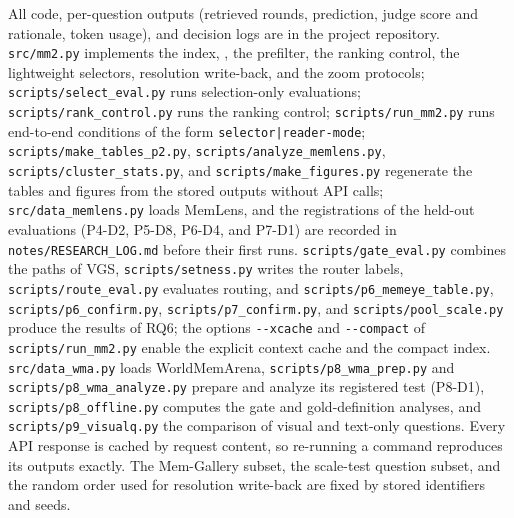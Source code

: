 All code, per-question outputs (retrieved rounds, prediction, judge score and rationale, token usage), and decision logs are in the project repository. \nolinkurl{src/mm2.py} implements the index, \qss{}, the prefilter, the ranking control, the lightweight selectors, resolution write-back, and the zoom protocols; \nolinkurl{scripts/select_eval.py} runs selection-only evaluations; \nolinkurl{scripts/rank_control.py} runs the ranking control; \nolinkurl{scripts/run_mm2.py} runs end-to-end conditions of the form \nolinkurl{selector|reader-mode}; \nolinkurl{scripts/make_tables_p2.py}, \nolinkurl{scripts/analyze_memlens.py}, \nolinkurl{scripts/cluster_stats.py}, and \nolinkurl{scripts/make_figures.py} regenerate the tables and figures from the stored outputs without API calls; \nolinkurl{src/data_memlens.py} loads MemLens, and the registrations of the held-out evaluations (P4-D2, P5-D8, P6-D4, and P7-D1) are recorded in \nolinkurl{notes/RESEARCH_LOG.md} before their first runs. \nolinkurl{scripts/gate_eval.py} combines the paths of VGS, \nolinkurl{scripts/setness.py} writes the router labels, \nolinkurl{scripts/route_eval.py} evaluates routing, and \nolinkurl{scripts/p6_memeye_table.py}, \nolinkurl{scripts/p6_confirm.py}, \nolinkurl{scripts/p7_confirm.py}, and \nolinkurl{scripts/pool_scale.py} produce the results of RQ6; the options \nolinkurl{--xcache} and \nolinkurl{--compact} of \nolinkurl{scripts/run_mm2.py} enable the explicit context cache and the compact index. \nolinkurl{src/data_wma.py} loads WorldMemArena, \nolinkurl{scripts/p8_wma_prep.py} and \nolinkurl{scripts/p8_wma_analyze.py} prepare and analyze its registered test (P8-D1), \nolinkurl{scripts/p8_offline.py} computes the gate and gold-definition analyses, and \nolinkurl{scripts/p9_visualq.py} the comparison of visual and text-only questions. Every API response is cached by request content, so re-running a command reproduces its outputs exactly. The Mem-Gallery subset, the scale-test question subset, and the random order used for resolution write-back are fixed by stored identifiers and seeds.
